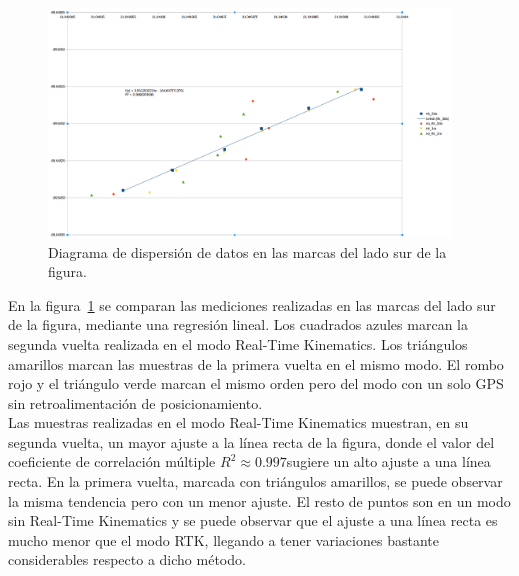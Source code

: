\begin{figure}[H]
\centering
\includegraphics[width=0.95\textwidth]{Figures/Dispers}
\caption[Diagrama de dispersión de datos en las marcas del lado sur de la figura.]{Diagrama de dispersión de datos en las marcas del lado sur de la figura.}
\label{fig:Disp}
\end{figure}

En la figura~\ref{fig:Disp} se comparan las mediciones realizadas en las marcas del lado sur de la figura, mediante una regresión lineal. Los cuadrados azules marcan la segunda vuelta realizada en el modo Real-Time Kinematics. Los triángulos amarillos marcan las muestras de la primera vuelta en el mismo modo. El rombo rojo y el triángulo verde marcan el mismo orden pero del modo con un solo GPS sin retroalimentación de posicionamiento.\\

Las muestras realizadas en el modo Real-Time Kinematics muestran, en su segunda vuelta, un mayor ajuste a la línea recta de la figura, donde el valor del coeficiente de correlación múltiple $R^{2} \approx 0.997$\footnotemark sugiere un alto ajuste a una línea recta. En la primera vuelta, marcada con triángulos amarillos, se puede observar la misma tendencia pero con un menor ajuste. El resto de puntos son en un modo sin Real-Time Kinematics y se puede observar que el ajuste a una línea recta es mucho menor que el modo RTK, llegando a tener variaciones bastante considerables respecto a dicho método.\\


